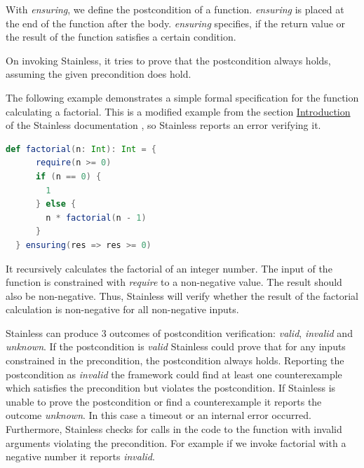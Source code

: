 With \textit{ensuring}, we define the postcondition of a function.
\textit{ensuring} is placed at the end of the function after the body.
\textit{ensuring} specifies, if the return value or the result of the function satisfies a certain condition.

On invoking Stainless, it tries to prove that the postcondition always holds, assuming the given precondition does hold.

The following example demonstrates a simple formal specification for the function calculating a factorial.
This is a modified example from the section \href{https://epfl-lara.github.io/stainless/intro.html}{Introduction} of the Stainless documentation \cite{Stainless:documentation}, so Stainless reports an error verifying it.
\begin{lstlisting}[language=Scala]
  def factorial(n: Int): Int = {
      require(n >= 0)
      if (n == 0) {
        1
      } else {
        n * factorial(n - 1)
      }
  } ensuring(res => res >= 0)
\end{lstlisting}

It recursively calculates the factorial of an integer number.
The input of the function is constrained with \textit{require} to a non-negative value.
The result should also be non-negative.
Thus, Stainless will verify whether the result of the factorial calculation is non-negative for all non-negative inputs.

Stainless can produce 3 outcomes of postcondition verification: \textit{valid}, \textit{invalid} and \textit{unknown}.
If the postcondition is \textit{valid} Stainless could prove that for any inputs constrained in the precondition, the postcondition always holds.
Reporting the postcondition as \textit{invalid} the framework could find at least one counterexample which satisfies the precondition but violates the postcondition.
If Stainless is unable to prove the postcondition or find a counterexample it reports the outcome \textit{unknown}.
In this case a timeout or an internal error occurred.
Furthermore, Stainless checks for calls in the code to the function with invalid arguments violating the precondition.
For example if we invoke factorial with a negative number it reports \textit{invalid}.

